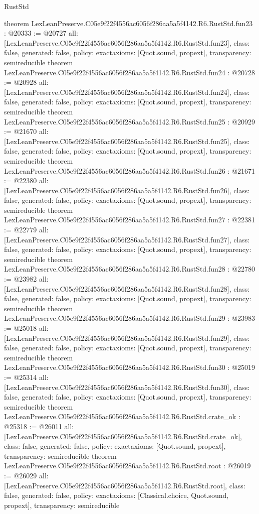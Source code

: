 \begin{lexlean}{RustStd}
\begin{coremodule}
{}
theorem LexLeanPreserve.C05e9f22f4556ac6056f286aa5a5f4142.R6.RustStd.fun23 : @20333 := @20727 {
  all: [LexLeanPreserve.C05e9f22f4556ac6056f286aa5a5f4142.R6.RustStd.fun23],
  class: false,
  generated: false,
  policy: exact{axioms: [Quot.sound, propext]},
  transparency: semireducible
}
theorem LexLeanPreserve.C05e9f22f4556ac6056f286aa5a5f4142.R6.RustStd.fun24 : @20728 := @20928 {
  all: [LexLeanPreserve.C05e9f22f4556ac6056f286aa5a5f4142.R6.RustStd.fun24],
  class: false,
  generated: false,
  policy: exact{axioms: [Quot.sound, propext]},
  transparency: semireducible
}
theorem LexLeanPreserve.C05e9f22f4556ac6056f286aa5a5f4142.R6.RustStd.fun25 : @20929 := @21670 {
  all: [LexLeanPreserve.C05e9f22f4556ac6056f286aa5a5f4142.R6.RustStd.fun25],
  class: false,
  generated: false,
  policy: exact{axioms: [Quot.sound, propext]},
  transparency: semireducible
}
theorem LexLeanPreserve.C05e9f22f4556ac6056f286aa5a5f4142.R6.RustStd.fun26 : @21671 := @22380 {
  all: [LexLeanPreserve.C05e9f22f4556ac6056f286aa5a5f4142.R6.RustStd.fun26],
  class: false,
  generated: false,
  policy: exact{axioms: [Quot.sound, propext]},
  transparency: semireducible
}
theorem LexLeanPreserve.C05e9f22f4556ac6056f286aa5a5f4142.R6.RustStd.fun27 : @22381 := @22779 {
  all: [LexLeanPreserve.C05e9f22f4556ac6056f286aa5a5f4142.R6.RustStd.fun27],
  class: false,
  generated: false,
  policy: exact{axioms: [Quot.sound, propext]},
  transparency: semireducible
}
theorem LexLeanPreserve.C05e9f22f4556ac6056f286aa5a5f4142.R6.RustStd.fun28 : @22780 := @23982 {
  all: [LexLeanPreserve.C05e9f22f4556ac6056f286aa5a5f4142.R6.RustStd.fun28],
  class: false,
  generated: false,
  policy: exact{axioms: [Quot.sound, propext]},
  transparency: semireducible
}
theorem LexLeanPreserve.C05e9f22f4556ac6056f286aa5a5f4142.R6.RustStd.fun29 : @23983 := @25018 {
  all: [LexLeanPreserve.C05e9f22f4556ac6056f286aa5a5f4142.R6.RustStd.fun29],
  class: false,
  generated: false,
  policy: exact{axioms: [Quot.sound, propext]},
  transparency: semireducible
}
theorem LexLeanPreserve.C05e9f22f4556ac6056f286aa5a5f4142.R6.RustStd.fun30 : @25019 := @25314 {
  all: [LexLeanPreserve.C05e9f22f4556ac6056f286aa5a5f4142.R6.RustStd.fun30],
  class: false,
  generated: false,
  policy: exact{axioms: [Quot.sound, propext]},
  transparency: semireducible
}
theorem LexLeanPreserve.C05e9f22f4556ac6056f286aa5a5f4142.R6.RustStd.crate_ok : @25318 := @26011 {
  all: [LexLeanPreserve.C05e9f22f4556ac6056f286aa5a5f4142.R6.RustStd.crate_ok],
  class: false,
  generated: false,
  policy: exact{axioms: [Quot.sound, propext]},
  transparency: semireducible
}
theorem LexLeanPreserve.C05e9f22f4556ac6056f286aa5a5f4142.R6.RustStd.root : @26019 := @26029 {
  all: [LexLeanPreserve.C05e9f22f4556ac6056f286aa5a5f4142.R6.RustStd.root],
  class: false,
  generated: false,
  policy: exact{axioms: [Classical.choice, Quot.sound, propext]},
  transparency: semireducible
}


\end{coremodule}
\end{lexlean}
